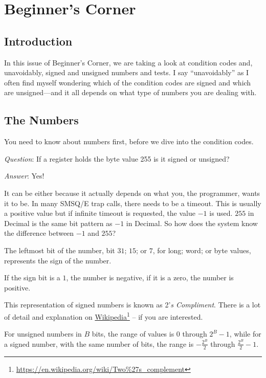 
\chapter{Beginner's Corner}\label{chpater: beginners corner}

\section{Introduction}

In this issue of Beginner's Corner, we are taking a look at condition
codes and, unavoidably, signed and unsigned numbers and tests. I say
``unavoidably'' as I often find myself wondering which of the condition
codes are signed and which are unsigned---and it all depends on
what type of numbers you are dealing with.

\section{The Numbers}

You need to know about numbers first, before we dive into the condition
codes. 

\emph{Question}: If a register holds the byte value 255
is it signed or unsigned?

\emph{Answer}: Yes!

It can be either because it actually depends on what you, the programmer,
wants it to be. In many SMSQ/E trap calls, there needs to be a timeout.
This is usually a positive value but if infinite timeout is requested,
the value $-1$ is used. $255$ in Decimal is the same bit pattern
as $-1$ in Decimal. So how does the system know the difference between
$-1$ and $255$?

The leftmost bit of the number, bit $31$; $15$; or $7$, for long;
word; or byte values, represents the sign of the number. 

If the sign bit is a $1$, the number is negative, if it is a zero,
the number is positive. 

This representation of signed numbers is known as 2'\emph{s Compliment}.
There is a lot of detail and explanation on \href{https://en.wikipedia.org/wiki/Two\%27s_complement}{Wikipedia}\footnote{\url{https://en.wikipedia.org/wiki/Two\%27s\_complement}}
-- if you are interested. 

For unsigned numbers in $B$ bits, the range of values is $0$ through
$2^{B}-1$, while for a signed number, with the same number of bits,
the range is $-\frac{2^{B}}{2}$ through $\frac{2^{B}}{2}-1$.

